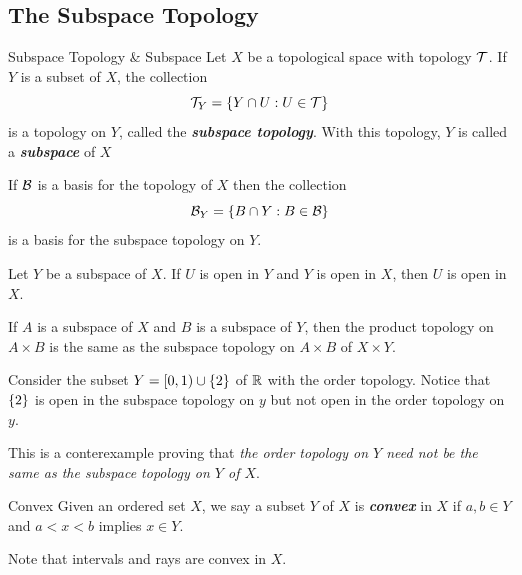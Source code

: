 \documentclass[12pt,a4paper]{article}
\begin{document}
    \subsection{The Subspace Topology}
    \begin{defi}{Subspace Topology \& Subspace}
        Let $X$ be a topological space with topology $\mathcal{T}$. If $Y$ is a subset of $X$, the collection
        $$
        \mathcal{T}_Y=\left\{Y\cap U: U\in\mathcal{T}\right\}
        $$
        is a topology on $Y$, called the \textbf{\textit{subspace topology}}. With this topology, $Y$ is called a \textit{\textbf{subspace}} of $X$
    \end{defi}
    \hfill

    \begin{lemma}
        If $\mathcal{B}$ is a basis for the topology of $X$ then the collection
        $$
        \mathcal{B}_Y=\left\{B\cap Y:B\in\mathcal{B}\right\}
        $$
        is a basis for the subspace topology on $Y$.
    \end{lemma}
    \hfill
    
    \begin{lemma}
        Let $Y$ be a subspace of $X$. If $U$ is open in $Y$ and $Y$ is open in $X$, then $U$ is open in $X$.
    \end{lemma}
    \hfill

    \begin{thm}
        If $A$ is a subspace of $X$ and $B$ is a subspace of $Y$, then the product topology on $A\times B$ is the same as the subspace topology on $A\times B$ of $X\times Y$.
    \end{thm}
    \hfill

    \begin{eg}
        Consider the subset $Y=[0,1)\cup\left\{2\right\}$ of $\mathbb{R}$ with the order topology. Notice that $\left\{2\right\}$ is open in the subspace topology on $y$ but not open in the order topology on $y$.
    \end{eg}
    \begin{remark}
        This is a conterexample proving that \textit{the order topology on $Y$ need not be the same as the subspace topology on $Y$ of $X$}.
    \end{remark}
    \hfill

    \begin{defi}{Convex}
        Given an ordered set $X$, we say a subset $Y$ of $X$ is \textbf{\textit{convex}} in $X$ if $a,b\in Y$ and $a<x<b$ implies $x\in Y$.
    \end{defi}
    \begin{remark}
        Note that intervals and rays are convex in $X$.
    \end{remark}
    \hfill
\end{document}
